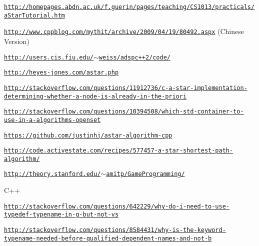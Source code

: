 \begin{DoxyItemize}
\item \href{http://homepages.abdn.ac.uk/f.guerin/pages/teaching/CS1013/practicals/aStarTutorial.htm}{\tt http\-://homepages.\-abdn.\-ac.\-uk/f.\-guerin/pages/teaching/\-C\-S1013/practicals/a\-Star\-Tutorial.\-htm}
\item \href{http://www.cppblog.com/mythit/archive/2009/04/19/80492.aspx}{\tt http\-://www.\-cppblog.\-com/mythit/archive/2009/04/19/80492.\-aspx} (Chinese Version)
\item \href{http://users.cis.fiu.edu/~weiss/adspc++2/code/}{\tt http\-://users.\-cis.\-fiu.\-edu/$\sim$weiss/adspc++2/code/}
\item \href{http://heyes-jones.com/astar.php}{\tt http\-://heyes-\/jones.\-com/astar.\-php}
\item \href{http://stackoverflow.com/questions/11912736/c-a-star-implementation-determining-whether-a-node-is-already-in-the-priori}{\tt http\-://stackoverflow.\-com/questions/11912736/c-\/a-\/star-\/implementation-\/determining-\/whether-\/a-\/node-\/is-\/already-\/in-\/the-\/priori}
\item \href{http://stackoverflow.com/questions/10394508/which-std-container-to-use-in-a-algorithms-openset}{\tt http\-://stackoverflow.\-com/questions/10394508/which-\/std-\/container-\/to-\/use-\/in-\/a-\/algorithms-\/openset}
\item \href{https://github.com/justinhj/astar-algorithm-cpp}{\tt https\-://github.\-com/justinhj/astar-\/algorithm-\/cpp}
\item \href{http://code.activestate.com/recipes/577457-a-star-shortest-path-algorithm/}{\tt http\-://code.\-activestate.\-com/recipes/577457-\/a-\/star-\/shortest-\/path-\/algorithm/}
\item \href{http://theory.stanford.edu/~amitp/GameProgramming/}{\tt http\-://theory.\-stanford.\-edu/$\sim$amitp/\-Game\-Programming/}
\end{DoxyItemize}

C++


\begin{DoxyItemize}
\item \href{http://stackoverflow.com/questions/642229/why-do-i-need-to-use-typedef-typename-in-g-but-not-vs}{\tt http\-://stackoverflow.\-com/questions/642229/why-\/do-\/i-\/need-\/to-\/use-\/typedef-\/typename-\/in-\/g-\/but-\/not-\/vs}
\item \href{http://stackoverflow.com/questions/8584431/why-is-the-keyword-typename-needed-before-qualified-dependent-names-and-not-b}{\tt http\-://stackoverflow.\-com/questions/8584431/why-\/is-\/the-\/keyword-\/typename-\/needed-\/before-\/qualified-\/dependent-\/names-\/and-\/not-\/b} 
\end{DoxyItemize}